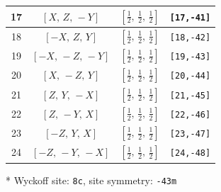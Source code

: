 \documentclass[fleqn,8pt]{jsarticle}
\begin{document}
\begin{longtable}{cccc}
17 & $\left[ X,\, Z,\, - Y \right]$ & $\left[ \frac{1}{2},\, \frac{1}{2},\, \frac{1}{2} \right]$ & {\tt [17,-41]} \\ \hline
18 & $\left[ - X,\, Z,\, Y \right]$ & $\left[ \frac{1}{2},\, \frac{1}{2},\, \frac{1}{2} \right]$ & {\tt [18,-42]} \\ \hline
19 & $\left[ - X,\, - Z,\, - Y \right]$ & $\left[ \frac{1}{2},\, \frac{1}{2},\, \frac{1}{2} \right]$ & {\tt [19,-43]} \\ \hline
20 & $\left[ X,\, - Z,\, Y \right]$ & $\left[ \frac{1}{2},\, \frac{1}{2},\, \frac{1}{2} \right]$ & {\tt [20,-44]} \\ \hline
21 & $\left[ Z,\, Y,\, - X \right]$ & $\left[ \frac{1}{2},\, \frac{1}{2},\, \frac{1}{2} \right]$ & {\tt [21,-45]} \\ \hline
22 & $\left[ Z,\, - Y,\, X \right]$ & $\left[ \frac{1}{2},\, \frac{1}{2},\, \frac{1}{2} \right]$ & {\tt [22,-46]} \\ \hline
23 & $\left[ - Z,\, Y,\, X \right]$ & $\left[ \frac{1}{2},\, \frac{1}{2},\, \frac{1}{2} \right]$ & {\tt [23,-47]} \\ \hline
24 & $\left[ - Z,\, - Y,\, - X \right]$ & $\left[ \frac{1}{2},\, \frac{1}{2},\, \frac{1}{2} \right]$ & {\tt [24,-48]} \\
\end{longtable}
* Wyckoff site: {\tt 8c}, site symmetry: {\tt -43m}
\renewcommand{\arraystretch}{1.2}
\end{document}
